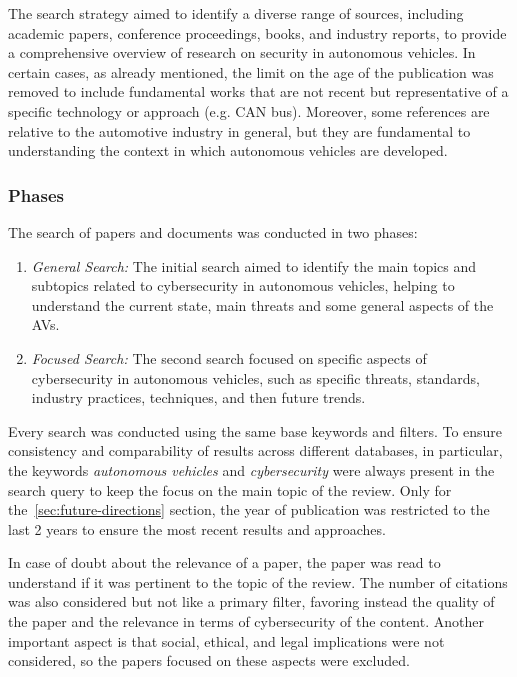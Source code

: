 The search strategy aimed to identify a diverse range of sources, including academic papers, conference proceedings, books, and industry reports, to provide a comprehensive overview of research on security in autonomous vehicles.
In certain cases, as already mentioned, the limit on the age of the publication was removed to include fundamental works that are not recent but representative of a specific technology or approach (e.g. CAN bus).
Moreover, some references are relative to the automotive industry in general, but they are fundamental to understanding the context in which autonomous vehicles are developed.

\subsubsection{Phases}\label{subsubsec:phases}
The search of papers and documents was conducted in two phases:
\begin{enumerate}
    \item \textit{General Search:} The initial search aimed to identify the main topics and subtopics related to cybersecurity in autonomous vehicles, helping to understand the current state, main threats and some general aspects of the AVs.
    \item \textit{Focused Search:} The second search focused on specific aspects of cybersecurity in autonomous vehicles, such as specific threats, standards, industry practices, techniques, and then future trends.
\end{enumerate}

Every search was conducted using the same base keywords and filters.
To ensure consistency and comparability of results across different databases, in particular, the keywords \textit{autonomous vehicles} and \textit{cybersecurity} were always present in the search query to keep the focus on the main topic of the review.
Only for the~\ref{sec:future-directions} section, the year of publication was restricted to the last 2 years to ensure the most recent results and approaches.

In case of doubt about the relevance of a paper, the paper was read to understand if it was pertinent to the topic of the review.
The number of citations was also considered but not like a primary filter, favoring instead the quality of the paper and the relevance in terms of cybersecurity of the content.
Another important aspect is that social, ethical, and legal implications were not considered, so the papers focused on these aspects were excluded.


